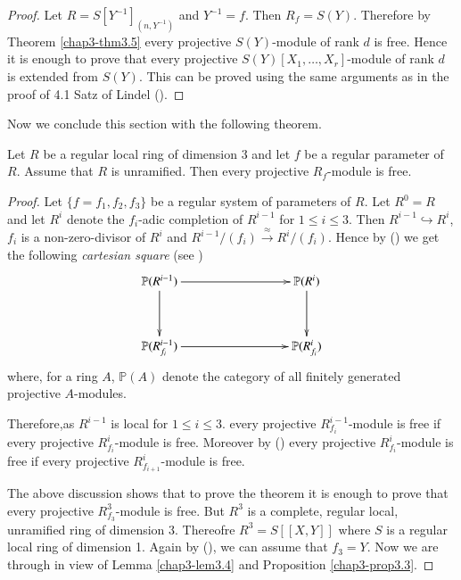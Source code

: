\begin{proof}
Let $R=S[Y^{-1}]_{(n,Y^{-1})}$ and $Y^{-1}=f$. Then
$R_{f}=S(Y)$. Therefore by Theorem \ref{chap3-thm3.5} every projective
$S(Y)$-module of rank $d$ is free. Hence it is enough to prove that
every projective $S(Y)[X_{1},\ldots,X_{r}]$-module of rank $d$ is
extended from $S(Y)$. This can be proved using the same arguments as
in the proof of 4.1 Satz of Lindel (\cite{chap3-L-2}). 
\end{proof}

Now we conclude this section with the following theorem.

\begin{theorem}\label{chap3-thm3.7}
Let $R$ be a regular local ring of dimension $3$ and let $f$ be a
regular parameter of $R$. Assume that $R$ is unramified. Then every
projective $R_{f}$-module is free.
\end{theorem}

\begin{proof}
Let $\{f=f_{1},f_{2},f_{3}\}$ be a regular system of parameters of
$R$. Let $R^{0}=R$ and let $R^{i}$ denote the $f_{i}$-adic completion
of $R^{i-1}$ for $1\leq i\leq 3$. Then $R^{i-1}\hookrightarrow R^{i}$,
$f_{i}$ is a non-zero-divisor of $R^{i}$ and
$R^{i-1}/(f_{i})\xrightarrow{\approx}R^{i}/(f_{i})$. Hence
by (\cite[\S\ 2]{chap3-R}) we get the following {\em cartesian square}
(see \cite[p.~359]{chap3-B})
\[
\xymatrix@R=1.2cm@C=3cm{
\mathbb{P}(R^{i-1})\ar[d]\ar[r] & \mathbb{P}(R^{i})\ar[d]\\
\mathbb{P}(R^{i-1}_{f_{i}})\ar[r] & \mathbb{P}(R^{i}_{f_{i}})
}
\]
where, for a ring $A$, $\mathbb{P}(A)$ denote the category of all
finitely generated projective $A$-modules.

Therefore,\pageoriginale as $R^{i-1}$ is local for $1\leq i\leq
3$. every projective $R^{i-1}_{f_{i}}$-module is free if every
projective $R^{i}_{f_{i}}$-module is free. Moreover by
(\cite[Proposition $2'$]{chap3-Mu}) every projective
$R^{i}_{f_{i}}$-module is free if every projective
$R^{i}_{f_{i+1}}$-module is free.

The above discussion shows that to prove the theorem it is enough to
prove that every projective $R^{3}_{f_{3}}$-module is free. But
$R^{3}$ is a complete, regular local, unramified ring of dimension
3. Thereofre $R^{3}=S[[X,Y]]$ where $S$ is a regular local ring of
dimension 1. Again by (\cite[Proposition $2'$]{chap3-Mu}), we can
assume that $f_{3}=Y$. Now we are through in view of
Lemma \ref{chap3-lem3.4} and Proposition \ref{chap3-prop3.3}.
\end{proof}


